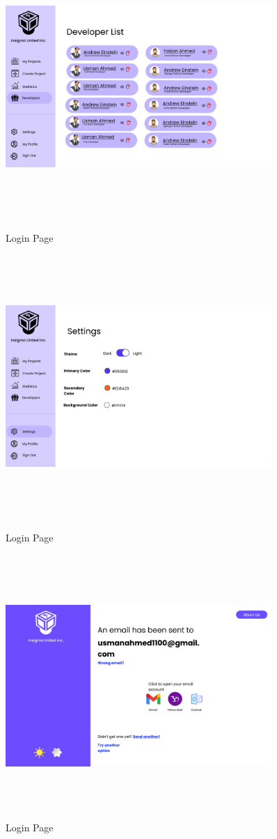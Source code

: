 \begin{figure}[H]
\includegraphics[height=10cm, width=0.9\textwidth]{./images/prototype/0005}
\centering 
\caption{Login Page}
\label{fig:prototype1}

\includegraphics[height=10cm, width=0.9\textwidth]{./images/prototype/0006}
\centering 
\caption{Login Page}
\label{fig:prototype1}

\pagebreak
\includegraphics[height=10cm, width=0.9\textwidth]{./images/prototype/0007}
\centering 
\caption{Login Page}
\label{fig:prototype1}


\end{figure}
